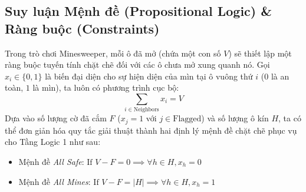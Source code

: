 \subsection{Suy luận Mệnh đề (Propositional Logic) \& Ràng buộc (Constraints)}
Trong trò chơi Minesweeper, mỗi ô đã mở (chứa một con số $V$) sẽ thiết lập một ràng buộc tuyến tính chặt chẽ đối với các ô chưa mở xung quanh nó. Gọi $x_i \in \{0, 1\}$ là biến đại diện cho sự hiện diện của mìn tại ô vuông thứ $i$ ($0$ là an toàn, $1$ là mìn), ta luôn có phương trình cục bộ:
\[ \sum_{i \in \text{Neighbors}} x_i = V \]
Dựa vào số lượng cờ đã cắm $F$ ($x_j = 1$ với $j \in \text{Flagged}$) và số lượng ô kín $H$, ta có thể đơn giản hóa quy tắc giải thuật thành hai định lý mệnh đề chặt chẽ phục vụ cho Tầng Logic 1 như sau:
\begin{itemize}
    \item Mệnh đề \textit{All Safe}: $\text{If } V - F = 0 \implies \forall h \in H, x_h = 0$
    \item Mệnh đề \textit{All Mines}: $\text{If } V - F = |H| \implies \forall h \in H, x_h = 1$
\end{itemize}
